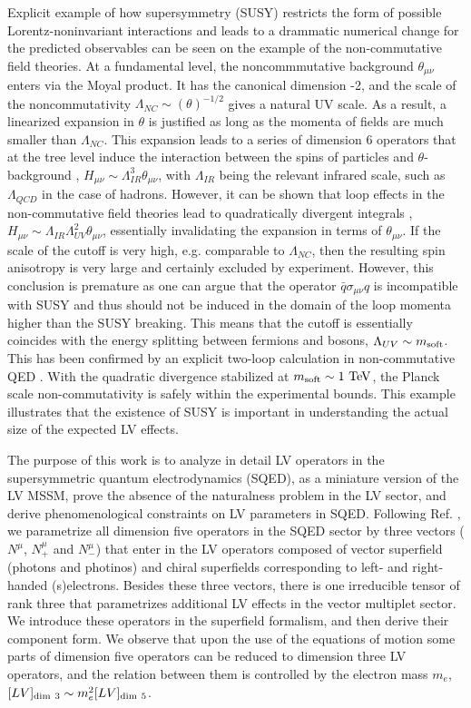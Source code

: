 \documentclass[12pt]{revtex4}
\begin{document}
Explicit example of how  supersymmetry (SUSY) restricts the form of possible 
Lorentz-noninvariant interactions and leads to a drammatic numerical change 
for the predicted observables can be seen on the example of the
non-commutative field theories.  At a fundamental level, the
noncommmutative background  
$\theta_{\mu\nu}$ enters via the Moyal product. It has the canonical 
dimension -2, and the scale of the noncommutativity $\Lambda_{NC}
\sim(\theta)^{-1/2}$ gives a natural UV scale. 
As a result, a linearized expansion in $\theta$ is justified 
as long as the momenta of fields  are much smaller than $\Lambda_{NC}$. 
This expansion leads to a series of dimension 6 operators
that at the tree level induce the interaction between the spins of 
particles and $\theta$-background \cite{MPR1}, $H_{\mu\nu} \sim \Lambda_{IR}^3\theta_{\mu\nu}$,
with $ \Lambda_{IR}$ being the relevant infrared scale, such as $\Lambda_{QCD}$ 
in the case of hadrons. However, it can be shown that loop effects in the 
non-commutative field theories lead to quadratically divergent integrals \cite{UCSC},
$H_{\mu\nu} \sim \Lambda_{IR}\Lambda_{UV}^2\theta_{\mu\nu}$, essentially
invalidating the expansion in terms of $\theta_{\mu\nu}$. 
If the scale of the cutoff is very high, e.g. comparable to $\Lambda_{NC}$, 
then the resulting spin anisotropy is very large and certainly excluded 
by experiment. However, this conclusion is premature as 
one can argue that the operator $\bar q \sigma_{\mu\nu} q$ 
is incompatible with SUSY \cite{MPR2} and thus should not be induced 
in the domain of the loop momenta higher than the SUSY breaking. 
This means that the cutoff is essentially coincides with the 
energy splitting between fermions and bosons, $\Lambda_{UV} \sim m_{\rm soft}$. 
This has been confirmed by an explicit two-loop calculation in non-commutative 
QED \cite{WMC2}. With the quadratic divergence stabilized at 
$m_{\rm soft}\sim 1~{\rm TeV}$,
the Planck scale non-commutativity is safely within the experimental 
bounds. This example illustrates that the existence of SUSY is important in 
understanding the actual size of the expected LV effects. 

The purpose of this work is to analyze in detail LV operators in 
the supersymmetric quantum electrodynamics (SQED),
as a miniature version of the LV MSSM, prove the absence of the
naturalness problem in the LV sector, and derive phenomenological
constraints on LV parameters in SQED.  Following
Ref. \cite{GrootNibbelink:2004za}, we  parametrize all dimension five
operators in the SQED sector  by three vectors ($N^{\mu}$,
$N^{\mu}_+$ and $N^{\mu}_-$) that enter in the LV operators
composed  of vector superfield (photons and photinos) and chiral
superfields corresponding to left- and right-handed (s)electrons. 
Besides these three vectors, there is one irreducible tensor of rank three 
that parametrizes additional LV effects in the vector multiplet sector. 
We introduce these operators in the superfield formalism, and then
derive their component form. We observe that upon the use of the
equations of motion some parts of dimension five operators can be
reduced to dimension three LV operators, and the relation  
between them is controlled by the electron mass $m_e$,  
$[LV]_{\rm dim~3} \sim m_e^2 [LV]_{\rm dim~5}$.
\end{document}

